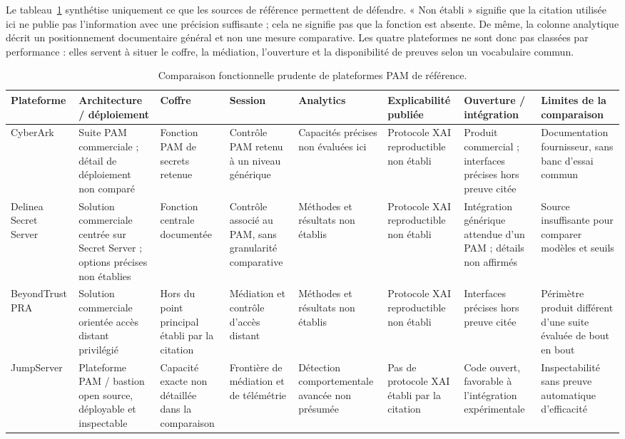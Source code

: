 \documentclass[11pt,a4paper,oneside]{report}
\theoremstyle{definition}
\theoremstyle{plain}
\begin{document}
Le tableau~\ref{tab:domain-pam-comparison} synthétise uniquement ce que les sources de référence permettent de défendre. « Non établi » signifie que la citation utilisée ici ne publie pas l'information avec une précision suffisante ; cela ne signifie pas que la fonction est absente. De même, la colonne analytique décrit un positionnement documentaire général et non une mesure comparative. Les quatre plateformes ne sont donc pas classées par performance : elles servent à situer le coffre, la médiation, l'ouverture et la disponibilité de preuves selon un vocabulaire commun.

\begin{table}[htbp]
\centering
\caption{Comparaison fonctionnelle prudente de plateformes PAM de référence.}
\label{tab:domain-pam-comparison}
\scriptsize
\begin{tabular}{@{}p{1.75cm}p{2.25cm}p{1.65cm}p{1.8cm}p{1.75cm}p{1.65cm}p{1.8cm}p{2.05cm}@{}}
\toprule
\textbf{Plateforme} & \textbf{Architecture / déploiement} & \textbf{Coffre} & \textbf{Session} & \textbf{Analytics} & \textbf{Explicabilité publiée} & \textbf{Ouverture / intégration} & \textbf{Limites de la comparaison} \\
\midrule
CyberArk~\cite{ref16}
& Suite PAM commerciale ; détail de déploiement non comparé & Fonction PAM de secrets retenue & Contrôle PAM retenu à un niveau générique & Capacités précises non évaluées ici & Protocole XAI reproductible non établi & Produit commercial ; interfaces précises hors preuve citée & Documentation fournisseur, sans banc d'essai commun \\
Delinea Secret Server~\cite{ref18}
& Solution commerciale centrée sur Secret Server ; options précises non établies & Fonction centrale documentée & Contrôle associé au PAM, sans granularité comparative & Méthodes et résultats non établis & Protocole XAI reproductible non établi & Intégration générique attendue d'un PAM ; détails non affirmés & Source insuffisante pour comparer modèles et seuils \\
BeyondTrust PRA~\cite{ref17}
& Solution commerciale orientée accès distant privilégié & Hors du point principal établi par la citation & Médiation et contrôle d'accès distant & Méthodes et résultats non établis & Protocole XAI reproductible non établi & Interfaces précises hors preuve citée & Périmètre produit différent d'une suite évaluée de bout en bout \\
JumpServer~\cite{ref5}
& Plateforme PAM / bastion open source, déployable et inspectable & Capacité exacte non détaillée dans la comparaison & Frontière de médiation et de télémétrie & Détection comportementale avancée non présumée & Pas de protocole XAI établi par la citation & Code ouvert, favorable à l'intégration expérimentale & Inspectabilité sans preuve automatique d'efficacité \\
\bottomrule
\end{tabular}
\end{table}
\end{document}
